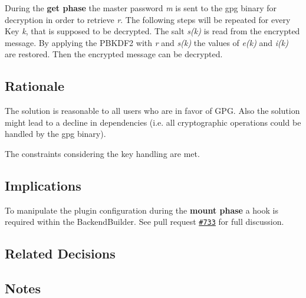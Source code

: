 During the {\bfseries get phase} the master password {\itshape m} is sent to the gpg binary for decryption in order to retrieve {\itshape r}. The following steps will be repeated for every Key {\itshape k}, that is supposed to be decrypted. The salt {\itshape s(k)} is read from the encrypted message. By applying the P\+B\+K\+D\+F2 with {\itshape r} and {\itshape s(k)} the values of {\itshape e(k)} and {\itshape i(k)} are restored. Then the encrypted message can be decrypted.

\subsection*{Rationale}

The solution is reasonable to all users who are in favor of G\+PG. Also the solution might lead to a decline in dependencies (i.\+e. all cryptographic operations could be handled by the gpg binary).

The constraints considering the key handling are met.

\subsection*{Implications}

To manipulate the plugin configuration during the {\bfseries mount phase} a hook is required within the {\ttfamily Backend\+Builder}. See pull request \href{https://github.com/ElektraInitiative/libelektra/pull/733}{\tt \#733} for full discussion.

\subsection*{Related Decisions}

\subsection*{Notes}